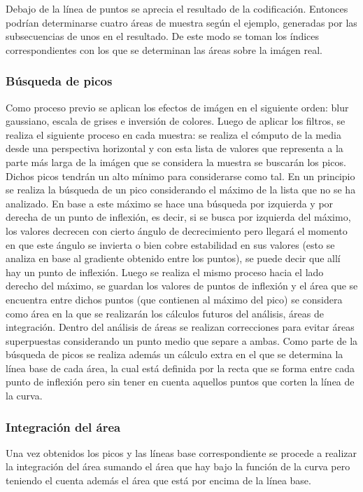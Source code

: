 Debajo de la l\'inea de puntos se aprecia el resultado de la codificaci\'on. Entonces podr\'ian determinarse cuatro \'areas de muestra seg\'un el ejemplo, generadas por las subsecuencias de unos en el resultado. De este modo se toman los \'indices correspondientes con los que se determinan las \'areas sobre la im\'agen real. 


\subsubsection{B\'usqueda de picos}
Como proceso previo se aplican los efectos de im\'agen en el siguiente orden: blur gaussiano, escala de grises e inversi\'on de colores. Luego de aplicar los filtros, se realiza el siguiente proceso en cada muestra: se realiza el c\'omputo de la media desde una perspectiva horizontal y con esta lista de valores que representa  a la parte m\'as larga de la im\'agen que se considera la muestra se buscar\'an los picos. Dichos picos tendr\'an un alto m\'inimo para considerarse como tal. En un principio se realiza la b\'usqueda de un pico considerando el m\'aximo de la lista que no se ha analizado. En base a este m\'aximo se hace una b\'usqueda por izquierda y por derecha de un punto de inflexi\'on, es decir, si se busca por izquierda del m\'aximo, los valores decrecen con cierto \'angulo de decrecimiento pero llegar\'a el momento en que este \'angulo se invierta o bien cobre estabilidad en sus valores (esto se analiza en base al gradiente obtenido entre los puntos), se puede decir que all\'i hay un punto de inflexi\'on. Luego se realiza el mismo proceso hacia el lado derecho del m\'aximo, se guardan los valores de puntos de inflexi\'on y el \'area que se encuentra entre dichos puntos (que contienen al m\'aximo del pico) se considera como \'area en la que se realizar\'an los c\'alculos futuros del an\'alisis, \'areas de integraci\'on. Dentro del an\'alisis de \'areas se realizan correcciones para evitar \'areas superpuestas considerando un punto medio que separe a ambas.
Como parte de la b\'usqueda de picos se realiza adem\'as un c\'alculo extra en el que se determina la l\'inea base de cada \'area, la cual est\'a definida por la recta que se forma entre cada punto de inflexi\'on pero sin tener en cuenta aquellos puntos que corten la l\'inea de la curva.

\subsubsection{Integraci\'on del \'area}
Una vez obtenidos los picos y las l\'ineas base correspondiente se procede a realizar la integraci\'on del \'area sumando el \'area que hay bajo la funci\'on de la curva pero teniendo el cuenta adem\'as el \'area que est\'a por encima de la l\'inea base.

